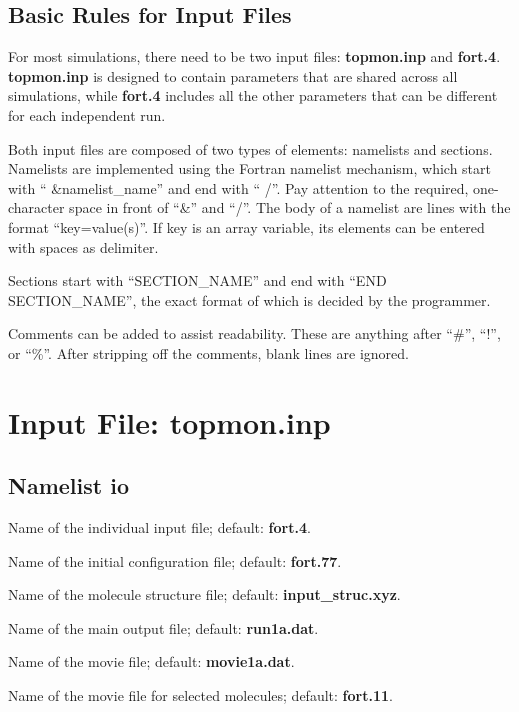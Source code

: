 \documentclass[12pt,letterpaper]{article}
\begin{document}
\subsection{Basic Rules for Input Files}
For most simulations, there need to be two input files: {\bf
  topmon.inp} and {\bf fort.4}. {\bf topmon.inp} is designed
to contain parameters that are shared across all
simulations, while {\bf fort.4} includes all the other
parameters that can be different for each independent run.

Both input files are composed of two types of elements:
namelists and sections. Namelists are implemented using the
Fortran namelist mechanism, which start with
`` \&namelist\_name'' and end with `` /''. Pay attention to
the required, one-character space in front of ``\&'' and
``/''. The body of a namelist are lines with the format
``key=value(s)''. If key is an array variable, its elements
can be entered with spaces as delimiter.

Sections start with ``SECTION\_NAME'' and end with ``END
SECTION\_NAME'', the exact format of which is decided by the
programmer.

Comments can be added to assist readability. These are
anything after ``\#'', ``!'', or ``\%''. After stripping off
the comments, blank lines are ignored.

\section{Input File: \textbf{topmon.inp}}
\subsection{Namelist \textbf{io}}
 Name of the individual input
file; default: \textbf{fort.4}.

 Name of the initial
configuration file; default: \textbf{fort.77}.

 Name of the molecule structure
file; default: \textbf{input\_struc.xyz}.

 Name of the main output file;
default: \textbf{run1a.dat}.

 Name of the movie file; default:
\textbf{movie1a.dat}.

 Name of the movie file for
selected molecules; default: \textbf{fort.11}.
\end{document}
